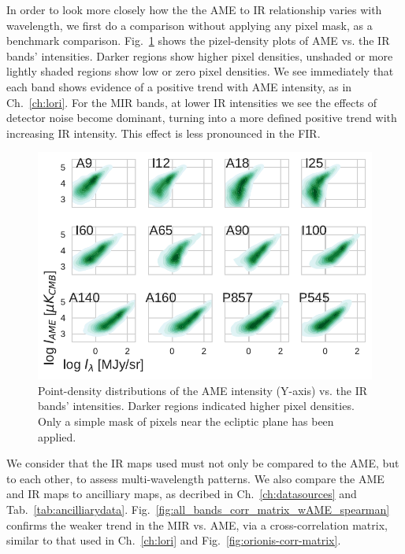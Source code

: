         In order to look more closely how the the AME to IR relationship varies with wavelength, we first do a comparison without applying any pixel mask, as a benchmark comparison. Fig.~\ref{fig:AMEvsDust_allsky_allbands_mpsub_kde_unmasked} shows the pizel-density plots of AME vs. the IR bands' intensities. Darker regions show higher pixel densities, unshaded or more lightly shaded regions show low or zero pixel densities. We see immediately that each band shows evidence of a positive trend with AME intensity, as in Ch.~\ref{ch:lori}. For the MIR bands, at lower IR intensities we see the effects of detector noise become dominant, turning into a more defined positive trend with increasing IR intensity. This effect is less pronounced in the FIR.
          \begin{figure}
            \includegraphics[width=\textwidth]{../Plots/ch_allsky/AMEvsDust_allsky_allbands_mpsub_kde_unmasked.pdf}
            \centering
            \caption{Point-density distributions of the AME intensity (Y-axis) vs. the IR bands' intensities. Darker regions indicated higher pixel densities. Only a simple mask of pixels near the ecliptic plane has been applied.}
            \label{fig:AMEvsDust_allsky_allbands_mpsub_kde_unmasked}
          \end{figure}
        We consider that the IR maps used must not only be compared to the AME, but to each other, to assess multi-wavelength patterns. We also compare the AME and IR maps to ancilliary maps, as decribed in Ch.~\ref{ch:datasources} and Tab.~\ref{tab:ancilliarydata}. Fig.~\ref{fig:all_bands_corr_matrix_wAME_spearman} confirms the weaker trend in the MIR vs. AME, via a cross-correlation matrix, similar to that used in Ch.~\ref{ch:lori} and Fig.~\ref{fig:orionis-corr-matrix}.
